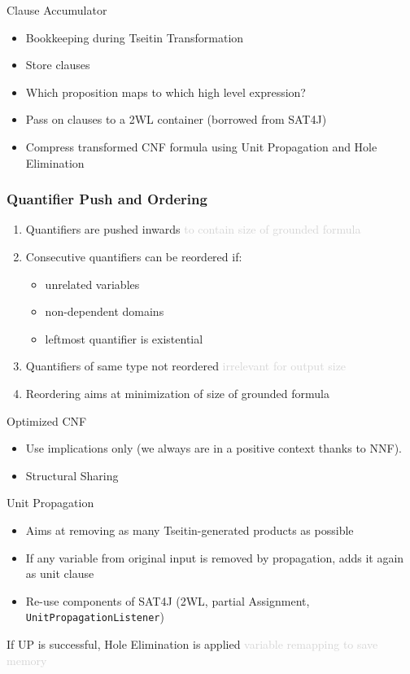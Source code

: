 \documentclass[smaller,dvipsnames,ratio=169]{beamer}
\begin{document}
  \begin{frame}{Clause Accumulator}
    \begin{itemize}
      \item \alert{Bookkeeping} during Tseitin Transformation
      \item Store clauses
      \item Which proposition maps to which high level expression?
      \item Pass on clauses to a 2WL container (borrowed from SAT4J)
      \item \alert{Compress} transformed CNF formula using Unit Propagation and Hole Elimination
    \end{itemize}
  \end{frame}
  
  \begin{frame}
    \frametitle{Quantifier Push and Ordering}
    \begin{enumerate}
      \item Quantifiers are pushed \alert{inwards} \textcolor{lightgray}{to contain size of grounded formula}
      \item Consecutive quantifiers can be reordered if:
      \begin{itemize}
        \item unrelated variables
        \item \alert{non-dependent} domains 
        \item leftmost quantifier is existential
      \end{itemize}
      \item Quantifiers of same type not reordered \textcolor{lightgray}{irrelevant for output size}
      \item Reordering aims at \alert{minimization} of size of grounded formula
    \end{enumerate}
  \end{frame}

  \begin{frame}{Optimized CNF}
    \begin{itemize}
      \item Use implications only (we always are in a positive context thanks to NNF).
  		\item Structural Sharing
  	\end{itemize}
  \end{frame}

  \begin{frame}{Unit Propagation}
    \begin{itemize}
      \item Aims at removing as many Tseitin-generated products as possible
      \item If any variable from original input is removed by propagation, adds it again as unit clause
      \item Re-use components of SAT4J (2WL, partial Assignment, \texttt{UnitPropagationListener})
    \end{itemize}
    If UP is successful, \alert{Hole Elimination} is applied \textcolor{lightgray}{variable remapping to save memory}
  \end{frame}
\end{document}
